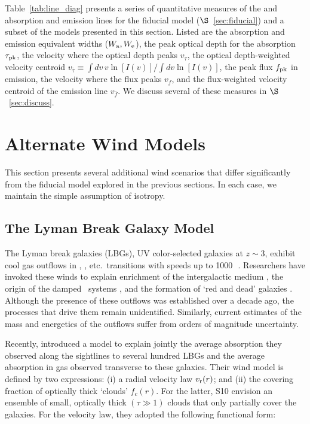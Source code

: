 \documentclass[12pt,preprint]{aastex}
\begin{document}
Table~\ref{tab:line_diag} presents a series of quantitative measures
of the  and  absorption and emission lines for
the fiducial model ($\S$~\ref{sec:fiducial}) and a subset of the models
presented in this section.  Listed are the absorption and emission
equivalent widths ($W_{\rm a}, W_{\rm e}$), the peak optical depth
for the absorption $\tau_{\rm pk}$, the
velocity where the optical depth peaks $v_\tau$, the optical
depth-weighted velocity centroid $v_{\bar \tau} \equiv \int dv \, v
\ln[I(v)] / \int dv \ln[I(v)]$, the peak flux $f_{\rm pk}$ in
emission, the velocity where the flux peaks $v_f$, and the
flux-weighted velocity centroid of the emission line $v_{\bar f}$.
We discuss several of these measures in $\S$~\ref{sec:discuss}.


\section{Alternate Wind Models}
\label{sec:alternate}

This section presents several additional wind scenarios that differ
significantly from the fiducial model explored in the previous
sections.  In each case, we maintain the simple assumption of
isotropy.

\subsection{The Lyman Break Galaxy Model}
\label{sec:lbg}

The Lyman break galaxies (LBGs), UV color-selected galaxies at $z \sim 3$,
exhibit cool gas outflows in , ,
etc.\ transitions with speeds up to 1000\,\kms\
\citep[e.g.][]{lkg+97,pks+98}.
Researchers have invoked these winds to explain enrichment of
the intergalactic medium \citep[e.g.][]{ahs+01,spa+06}, the origin of the
damped \lya\ systems \citep{nbf98,schaye01a}, and the formation of
`red and dead' galaxies \citep[e.g.][]{spf01}.  Although the
presence of these outflows was established over a decade ago,
the processes that drive them remain
unidentified.  Similarly,  current estimates of the mass and energetics of the
outflows suffer from orders of magnitude uncertainty.

Recently, \citet[][hereafter S10]{steidel+10} introduced a model to
explain jointly the average absorption they observed
along the sightlines to several hundred LBGs and the average absorption in gas
observed transverse to these galaxies.  
Their wind model is defined by two
expressions: (i) a radial velocity law $v_{\rm r}(r)$; and (ii) the covering
fraction of optically thick `clouds' $f_c(r)$.  For the latter, S10
envision an 
ensemble of small, optically thick $(\tau \gg 1)$ clouds that only
partially cover the galaxies.
For the velocity law, they adopted the following functional
form:
\end{document}

